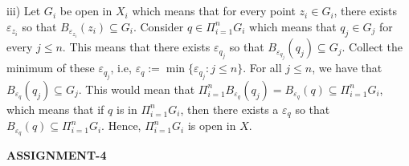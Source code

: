 \documentclass[../Main.tex]{subfiles}
\begin{document}
\\\\ iii) Let $G_i$ be open in $X_i$ which means that for every point $z_i \in G_i$, there exists $\varepsilon_{z_i}$ so that $B_{\varepsilon_{z_i}}(z_i) \subseteq G_i$.
Consider $q \in \Pi_{i=1}^n G_i$ which means that $q_j \in G_j$ for every $j \leq n$. This means that there exists $\varepsilon_{q_j}$ so that $B_{\varepsilon_{q_j}}(q_j) \subseteq G_j$. Collect the minimum of these $\varepsilon_{q_j}$, i.e, $\varepsilon_q:=\min\{\varepsilon_{q_j}:j \leq n\}$. For all $j \leq n$, we have that $B_{\varepsilon_q}(q_j) \subseteq G_j$. This would mean that $\Pi_{i=1}^n B_{\varepsilon_q}(q_j)=B_{\varepsilon_q}(q) \subseteq \Pi_{i=1}^n G_i$, which means that if $q$ is in $\Pi_{i=1}^n G_i$, then there exists a $\varepsilon_q$ so that $B_{\varepsilon_q}(q) \subseteq \Pi_{i=1}^n G_i$. Hence, $\Pi_{i=1}^nG_i$ is open in $X$. 
\begin{center}
    \textbf{ASSIGNMENT-4}
\end{center}
\end{document}

